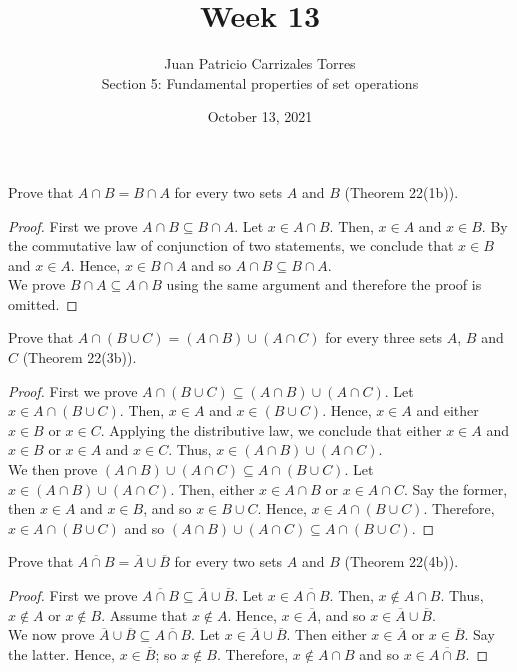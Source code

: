 \documentclass[12pt]{article}
\newenvironment{problem}[2][Problem]{\begin{trivlist}
		\item[\hskip \labelsep {\bfseries #1}\hskip \labelsep {\bfseries #2.}]}{\end{trivlist}}
\begin{document}
	
	\title{Week 13}
	\author{Juan Patricio Carrizales Torres \\
		Section 5: Fundamental properties of set operations}
	\date{October 13, 2021}
	\maketitle

	\begin{problem}{52}
		Prove that $A\cap B = B\cap A$ for every two sets $A$ and $B$ (Theorem 22(1b)).
		\begin{proof}
			First we prove $A\cap B \subseteq B\cap A$. Let $x\in A\cap B$. Then, $x\in A$ and $x\in B$. By the  commutative law of conjunction of two statements, we conclude that $x\in B$ and $x\in A$. Hence, $x\in B\cap A$ and so $A\cap B \subseteq B\cap A$.\\
			We prove $B\cap A \subseteq A\cap B$ using the same argument and therefore the proof is omitted.
		\end{proof}
	\end{problem}

	\begin{problem}{53}
		Prove that $A\cap (B\cup C) = (A\cap B)\cup (A\cap C)$ for every three sets $A$, $B$ and $C$ (Theorem 22(3b)).
		\begin{proof}
			First we prove $A\cap (B\cup C) \subseteq (A\cap B)\cup (A\cap C)$. Let $x\in A\cap (B\cup C)$. Then, $x\in A$ and $x\in (B\cup C)$. Hence, $x\in A$ and either $x \in B$ or $x\in C$. Applying the distributive law, we conclude that either $x\in A$ and $x\in B$ or $x\in A$ and $x\in C$. Thus, $x\in (A\cap B)\cup(A\cap C)$.\\
			
			We then prove $(A\cap B)\cup (A\cap C) \subseteq A\cap (B\cup C)$. Let $x\in (A\cap B)\cup (A\cap C)$. Then, either $x\in A\cap B$ or $x\in A\cap C$. Say the former, then $x\in A$ and $x\in B$, and so $x\in B\cup C$. Hence, $x\in A\cap (B\cup C)$. Therefore, $x\in A\cap (B\cup C)$ and so $(A\cap B)\cup (A\cap C) \subseteq A\cap (B\cup C)$.
		\end{proof}
	\end{problem}

	\begin{problem}{54} 
		Prove that $\overline{A\cap B} = \overline{A}\cup \overline{B}$ for every two sets $A$ and $B$ (Theorem 22(4b)).
		\begin{proof}
			First we prove $\overline{A\cap B} \subseteq \overline{A}\cup \overline{B}$. Let $x\in \overline{A\cap B}$. Then, $x\not\in A\cap B$. Thus, $x\not\in A$ or $x\not\in B$. Assume that $x\not\in A$. Hence, $x\in \overline{A}$, and so $x\in \overline{A}\cup \overline{B}$.\\
			
			We now prove $ \overline{A}\cup \overline{B} \subseteq \overline{A\cap B}$. Let $x\in \overline{A}\cup \overline{B}$. Then either $x\in \overline{A}$ or $x\in \overline{B}$. Say the latter. Hence, $x\in \overline{B}$; so $x\not\in B$. Therefore, $x\not\in A\cap B$ and so $x\in \overline{A\cap B}$.
		\end{proof} 
	\end{problem}
\end{document}
